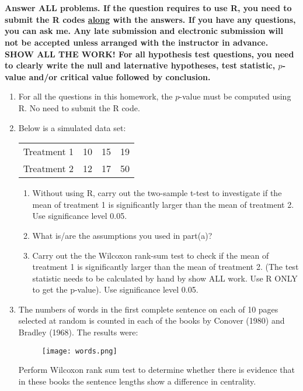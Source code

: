 \documentclass[12pt]{article}
\begin{document}
\section*{}

\textbf{Answer ALL problems. If the question requires to use R, you need to submit the R codes \underline{along} with the answers. If you have any questions, you can ask me. Any late submission and electronic submission will not be accepted unless arranged with the instructor in advance. SHOW ALL THE WORK! For all hypothesis test questions, you need to clearly write the null and laternative hypotheses, test statistic, $p$-value and/or critical value followed by conclusion.}

\begin{enumerate}
\item[] For all the questions in this homework, the $p$-value must be computed using R. No need to submit the R code. 
\item Below is a simulated data set:
\vspace{-0.2in}
\begin{table}[H]
\centering
\begin{tabular}{c c c c}
\hline
Treatment 1 & 10 & 15&19\\ [0.5ex]
Treatment 2 & 12&17&50\\[0.5ex]
\hline
\end{tabular}
\end{table}
\vspace{-0.2in}
\begin{enumerate}
\item Without using R, carry out the two-sample t-test to investigate if the mean of treatment 1 is significantly larger than the mean of treatment 2. Use significance level 0.05. 
\item What is/are the assumptions you used in part(a)?
\item Carry out the the Wilcoxon rank-sum test to check if the mean of treatment 1 is significantly larger than the mean of treatment 2. (The test statistic needs to be calculated by hand by show ALL work. Use R ONLY to get the p-value). Use significance level 0.05. 
\end{enumerate}



\item The numbers of words in the first complete sentence on each of 10 pages selected at random is counted in each of the books by Conover (1980) and Bradley (1968). The results were:
\vspace{-0.1in}
 \begin{figure}[H]
 \centering
 \texttt{[image: words.png]}
 \end{figure}
\vspace{-0.2in}
Perform Wilcoxon rank sum test to determine whether there is evidence that in these books the sentence lengths show a difference in centrality.


\end{enumerate}
\end{document}
